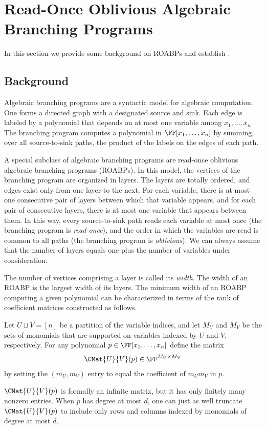 \documentclass{toc}
\begin{document}
\section{Read-Once Oblivious Algebraic Branching Programs}
\label{s.constant-width-roabp}

In this section we provide some background on ROABPs and establish
.

\subsection{Background}
\label{s.roabp.background}

Algebraic branching programs are a syntactic model for algebraic
computation.
One forms a directed graph with a designated source and sink.
Each edge is labeled by a polynomial that depends on at most one variable
among \(x_1,\ldots,x_n\).
The branching program computes a polynomial in \(\FF[x_1,\ldots,x_n]\) by
summing,
over all source-to-sink paths,
the product of the labels on the edges of each path.

A special subclass of algebraic branching programs are read-once oblivious
algebraic branching programs (ROABPs).
In this model, the vertices of the branching program are organized in layers.
The layers are totally ordered,
and edges exist only from one layer to the next.
For each variable,
there is at most one consecutive pair of layers between which that variable
appears,
and for each pair of consecutive layers,
there is at most one variable that appears between them.
In this way, every source-to-sink path reads each variable at most once
(the branching program is \emph{read-once}),
and the order in which the variables are read is common to all paths (the
branching program is \emph{oblivious}).
We can always assume that the number of layers equals one plus the number of
variables under consideration.

The number of vertices comprising a layer is called its \emph{width}.
The width of an ROABP is the largest width of its layers.
The minimum width of an ROABP computing a given polynomial can be
characterized in terms of the rank of coefficient matrices constructed as
follows.
\begin{definition}
  \label{def.var-split-poly-matrix}
  Let \(U\sqcup V = [n]\) be a partition of the variable indices,
  and let \({M}_U\) and \({M}_V\) be the sets of monomials
  that are supported on variables indexed by \(U\) and \(V\), respectively.
  For any polynomial \(p\in\FF[x_1,\ldots,x_n]\) define the matrix
  \[
    \CMat{U}{V}(p)
    \in
    \FF^{{M}_U \times {M}_V}
  \]
  by setting the \(({m}_U,{m}_V)\) entry to equal
  the coefficient of \({m}_U{m}_V\) in \(p\).
\end{definition}
\(\CMat{U}{V}(p)\) is formally an infinite matrix,
but it has only finitely many nonzero entries.
When \(p\) has degree at most \(d\),
one can just as well truncate \(\CMat{U}{V}(p)\) to include only rows and
columns indexed by monomials of degree at most \(d\).
\end{document}
